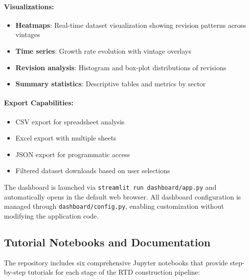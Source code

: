 \documentclass[a4paper, fleqn, 11pt]{article}
\newcommand{\filepath}[1]{\texttt{#1}}
\newcommand{\bashcmd}[1]{\texttt{#1}}
\begin{document}
\paragraph{Visualizations:}
\begin{itemize}
    \item \textbf{Heatmaps}: Real-time dataset visualization showing revision patterns across vintages
    \item \textbf{Time series}: Growth rate evolution with vintage overlays
    \item \textbf{Revision analysis}: Histogram and box-plot distributions of revisions
    \item \textbf{Summary statistics}: Descriptive tables and metrics by sector
\end{itemize}

\paragraph{Export Capabilities:}
\begin{itemize}
    \item CSV export for spreadsheet analysis
    \item Excel export with multiple sheets
    \item JSON export for programmatic access
    \item Filtered dataset downloads based on user selections
\end{itemize}

The dashboard is launched via \bashcmd{streamlit run dashboard/app.py} and automatically opens in the default web browser. All dashboard configuration is managed through \filepath{dashboard/config.py}, enabling customization without modifying the application code.

\subsection{Tutorial Notebooks and Documentation}

The repository includes six comprehensive Jupyter notebooks that provide step-by-step tutorials for each stage of the RTD construction pipeline:
\end{document}
